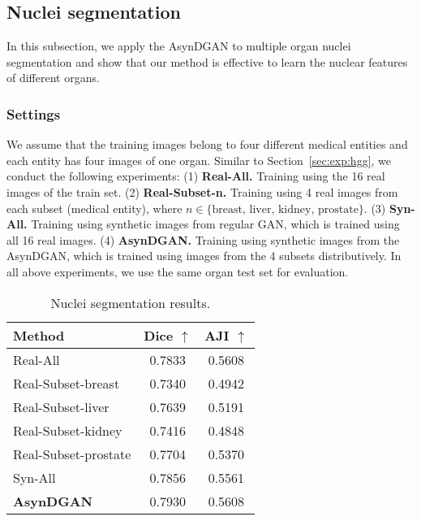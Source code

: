\subsection{Nuclei segmentation}
In this subsection, we apply the AsynDGAN to multiple organ nuclei segmentation and show that our method is effective to learn the nuclear features of different organs. 
\vspace{-1em}
\subsubsection{Settings}
We assume that the training images belong to four different medical entities and each entity has four images of one organ. Similar to Section~\ref{sec:exp:hgg}, we conduct the following experiments:
(1) \textbf{Real-All.} Training using the 16 real images of the train set.
(2) \textbf{Real-Subset-n.} Training using 4 real images from each subset (medical entity), where $n\in\{\text{breast, liver, kidney, prostate}\}$.
(3) \textbf{Syn-All.} Training using synthetic images from regular GAN, which is trained using all 16 real images.
(4) \textbf{AsynDGAN.} Training using synthetic images from the AsynDGAN, which is trained using images from the 4 subsets distributively.
In all above experiments, we use the same organ test set for evaluation.

\begin{table}[t]
	\vspace{-0.7em}
	\begin{center}
		\begin{tabular}{lcc}
			\toprule
			Method & Dice $\uparrow$ & AJI $\uparrow$\\
			\midrule
			Real-All & 0.7833 &	0.5608  \\ \midrule
			Real-Subset-breast & 0.7340  &	0.4942 \\
			Real-Subset-liver & 0.7639 & 0.5191 \\
			Real-Subset-kidney & 0.7416 & 0.4848 \\
			Real-Subset-prostate &0.7704 & 0.5370 \\ \midrule
			Syn-All & 0.7856 &	0.5561 \\ \midrule
			\textbf{AsynDGAN}  & 0.7930 & 0.5608 \\
			\bottomrule
		\end{tabular}
	\end{center}
	\vspace{-0.3em}
	\caption{Nuclei segmentation results.}
	\label{tab:nuclei}
	\vspace{-1em}
\end{table}


